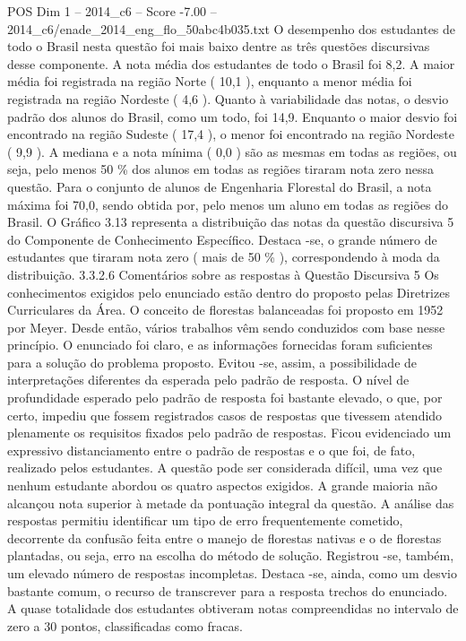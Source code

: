 \begin{textsample}{POS Dim 1 – 2014\_c6 – Score -7.00 – 2014\_c6/enade\_2014\_eng\_flo\_50abc4b035.txt}
O desempenho dos estudantes de todo o Brasil nesta questão foi mais baixo dentre as três questões discursivas desse componente.
A nota média dos estudantes de todo o Brasil foi 8,2.
A maior média foi registrada na região Norte ( 10,1 ), enquanto a menor média foi registrada na região Nordeste ( 4,6 ).
Quanto à variabilidade das notas, o desvio padrão dos alunos do Brasil, como um todo, foi 14,9.
Enquanto o maior desvio foi encontrado na região Sudeste ( 17,4 ), o menor foi encontrado na região Nordeste ( 9,9 ).
A mediana e a nota mínima ( 0,0 ) são as mesmas em todas as regiões, ou seja, pelo menos 50 \% dos alunos em todas as regiões tiraram nota zero nessa questão.
Para o conjunto de alunos de Engenharia Florestal do Brasil, a nota máxima foi 70,0, sendo obtida por, pelo menos um aluno em todas as regiões do Brasil.
O Gráfico 3.13 representa a distribuição das notas da questão discursiva 5 do Componente de Conhecimento Específico.
Destaca -se, o grande número de estudantes que tiraram nota zero ( mais de 50 \% ), correspondendo à moda da distribuição. 3.3.2.6 Comentários sobre as respostas à Questão Discursiva 5 Os conhecimentos exigidos pelo enunciado estão dentro do proposto pelas Diretrizes Curriculares da Área.
O conceito de florestas balanceadas foi proposto em 1952 por Meyer.
Desde então, vários trabalhos vêm sendo conduzidos com base nesse princípio.
O enunciado foi claro, e as informações fornecidas foram suficientes para a solução do problema proposto.
Evitou -se, assim, a possibilidade de interpretações diferentes da esperada pelo padrão de resposta.
O nível de profundidade esperado pelo padrão de resposta foi bastante elevado, o que, por certo, impediu que fossem registrados casos de respostas que tivessem atendido plenamente os requisitos fixados pelo padrão de respostas.
Ficou evidenciado um expressivo distanciamento entre o padrão de respostas e o que foi, de fato, realizado pelos estudantes.
A questão pode ser considerada difícil, uma vez que nenhum estudante abordou os quatro aspectos exigidos.
A grande maioria não alcançou nota superior à metade da pontuação integral da questão.
A análise das respostas permitiu identificar um tipo de erro frequentemente cometido, decorrente da confusão feita entre o manejo de florestas nativas e o de florestas plantadas, ou seja, erro na escolha do método de solução.
Registrou -se, também, um elevado número de respostas incompletas.
Destaca -se, ainda, como um desvio bastante comum, o recurso de transcrever para a resposta trechos do enunciado.
A quase totalidade dos estudantes obtiveram notas compreendidas no intervalo de zero a 30 pontos, classificadas como fracas.

\end{textsample}

